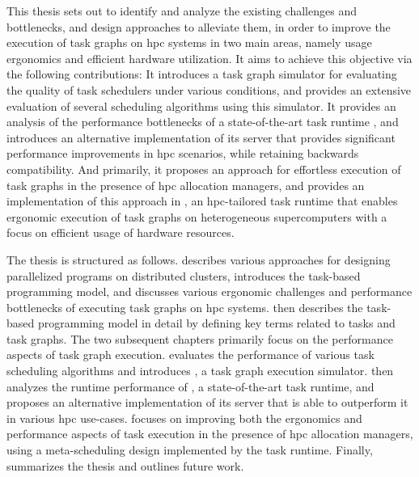 This thesis sets out to identify and analyze the existing challenges and bottlenecks, and design
approaches to alleviate them, in order to improve the execution of task graphs on
\gls{hpc} systems in two main areas, namely usage ergonomics and efficient hardware
utilization. It aims to achieve this objective via the following contributions: It introduces a
task graph simulator for evaluating the quality of task schedulers under various conditions, and
provides an extensive evaluation of several scheduling algorithms using this simulator. It provides
an analysis of the performance bottlenecks of a state-of-the-art task runtime
\dask{}, and introduces an alternative implementation of its server that provides
significant performance improvements in \gls{hpc} scenarios, while retaining backwards
compatibility. And primarily, it proposes an approach for effortless execution of task graphs in
the presence of \gls{hpc} allocation managers, and provides an implementation of this
approach in \hyperqueue{}, an \gls{hpc}-tailored task runtime that enables
ergonomic execution of task graphs on heterogeneous supercomputers with a focus on efficient usage
of hardware resources.

The thesis is structured as follows.  describes various approaches for
designing parallelized programs on distributed clusters, introduces the task-based programming
model, and discusses various ergonomic challenges and performance bottlenecks of executing task
graphs on \gls{hpc} systems.  then describes the task-based
programming model in detail by defining key terms related to tasks and task graphs. The two
subsequent chapters primarily focus on the performance aspects of task graph execution.
 evaluates the performance of various task scheduling algorithms and
introduces \estee{}, a task graph execution simulator.  then
analyzes the runtime performance of \dask{}, a state-of-the-art task runtime, and
proposes an alternative implementation of its server that is able to outperform it in various
\gls{hpc} use-cases.  focuses on improving both the ergonomics
and performance aspects of task execution in the presence of \gls{hpc} allocation
managers, using a meta-scheduling design implemented by the \hyperqueue{} task runtime.
Finally,~ summarizes the thesis and outlines future work.

